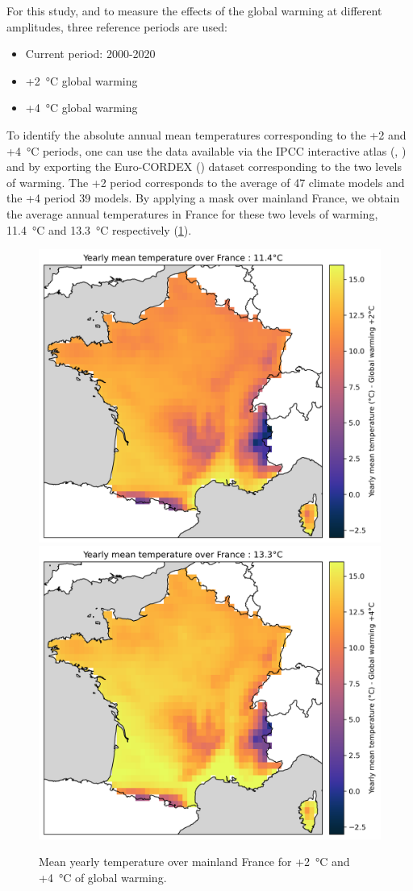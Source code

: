 \documentclass[11pt]{article}
\begin{document}
        For this study, and to measure the effects of the global warming at different amplitudes, three reference periods are used:
        \begin{itemize}
            \item Current period: 2000-2020
            \item +\SI{2}{\celsius} global warming
            \item +\SI{4}{\celsius} global warming
        \end{itemize}
        To identify the absolute annual mean temperatures corresponding to the +2 and +\SI{4}{\celsius} periods, one can use the data available via the IPCC interactive atlas (\cite{ipcc_climate_2021}, \cite{iturbide_implementation_2022}) and by exporting the Euro-CORDEX (\cite{jacob_euro-cordex_2014}) dataset corresponding to the two levels of warming. The +2 period corresponds to the average of 47 climate models and the +4 period 39 models. By applying a mask over mainland France, we obtain the average annual temperatures in France for these two levels of warming, \SI{11.4}{\celsius} and \SI{13.3}{\celsius} respectively (\ref{fig:gw24}).\\

        \begin{figure}[ht]
            \centering
            \includegraphics[width=0.49\columnwidth]{figures/mean_yearly_temperature_france_gw2deg.png}
            \includegraphics[width=0.49\columnwidth]{figures/mean_yearly_temperature_france_gw4deg.png}
            \caption{\label{fig:gw24} Mean yearly temperature over mainland France for +\SI{2}{\celsius} and +\SI{4}{\celsius} of global warming.}
        \end{figure}
\end{document}
